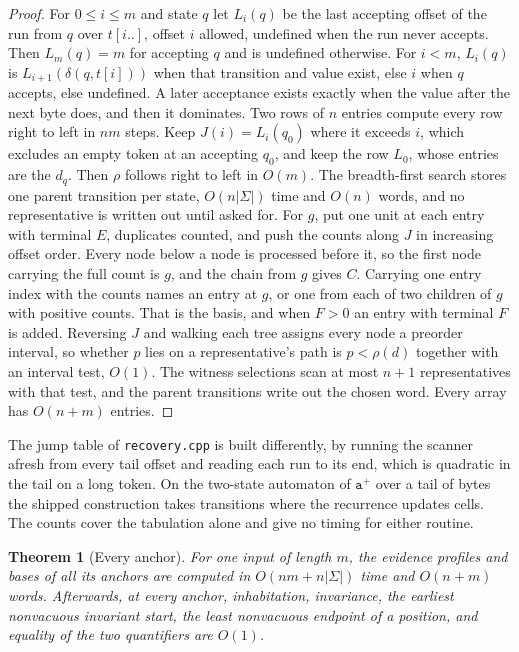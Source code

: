 \documentclass[11pt,a4paper]{article}
\theoremstyle{definition}
\theoremstyle{plain}
\newtheorem{theorem}{Theorem}
\theoremstyle{remark}
\newcommand{\code}[1]{\texttt{#1}}
\newcommand{\suffix}[2]{#1[#2..]}
\begin{document}
\begin{proof}
For $0 \le i \le m$ and state $q$ let $L_i(q)$ be the last accepting offset of the run from $q$ over $\suffix{t}{i}$,
offset $i$ allowed, undefined when the run never accepts. Then $L_m(q) = m$ for accepting $q$ and is undefined
otherwise. For $i < m$, $L_i(q)$ is $L_{i+1}(\delta(q, t[i]))$ when that transition and value exist, else $i$ when $q$
accepts, else undefined. A later acceptance exists exactly when the value after the next byte does, and then it
dominates. Two rows of $n$ entries compute every row right to left in $nm$ steps. Keep $J(i) = L_i(q_0)$ where it
exceeds $i$, which excludes an empty token at an accepting $q_0$, and keep the row $L_0$, whose entries are the $d_q$.
Then $\rho$ follows right to left in $O(m)$. The breadth-first search stores one parent transition per state,
$O(n|\Sigma|)$ time and $O(n)$ words, and no representative is written out until asked for. For $g$, put one unit at
each entry with terminal $E$, duplicates counted, and push the counts along $J$ in increasing offset order. Every node
below a node is processed before it, so the first node carrying the full count is $g$, and the chain from $g$ gives $C$.
Carrying one entry index with the counts names an entry at $g$, or one from each of two children of $g$ with positive
counts. That is the basis, and when $F > 0$ an entry with terminal $F$ is added. Reversing $J$ and walking each tree
assigns every node a preorder interval, so whether $p$ lies on a representative's path is $p < \rho(d)$ together with an
interval test, $O(1)$. The witness selections scan at most $n + 1$ representatives with that test, and the parent
transitions write out the chosen word. Every array has $O(n + m)$ entries.
\end{proof}

The jump table of \code{recovery.cpp} is built differently, by running the scanner afresh from every tail offset and
reading each run to its end, which is quadratic in the tail on a long token. On the two-state automaton of
$\code{a}^{+}$ over a tail of \ExactUnaryLength{} bytes the shipped construction takes \ExactShippedSteps{} transitions
where the recurrence updates \ExactRecurrenceCells{} cells. The counts cover the tabulation alone and give no timing for
either routine.

\begin{theorem}[Every anchor]
\label{thm:anchors}
For one input of length $m$, the evidence profiles and bases of all its anchors are computed in $O(nm + n|\Sigma|)$ time
and $O(n + m)$ words. Afterwards, at every anchor, inhabitation, invariance, the earliest nonvacuous invariant start,
the least nonvacuous endpoint of a position, and equality of the two quantifiers are $O(1)$.
\end{theorem}
\end{document}
